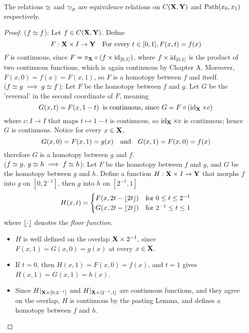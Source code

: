 \documentclass[../main-manifolds.tex]{subfiles}
\begin{document}
\begin{wts}\label{munkres:lemma-51.1}
    The relations $\simeq$ and $\simeq_p$ are equivalence relations on $C({\mathbf{X}},{\mathbf{Y}})$ and $\Path[x_0,x_1]$ respectively.
\end{wts}
\begin{proof}
    ($f\simeq f$): Let $f\in C({\mathbf{X}}, {\mathbf{Y}})$. Define 
    \[
        F:{\mathbf{X}}\times I\to {\mathbf{Y}}\quad \text{For every } t\in [0,1], F(x,t)=f(x)
    \]
    $F$ is continuous, since $F = \pi_{{\mathbf{X}}}\circ (f\times \operatorname{id}_{[0,1]})$, where $f\times \operatorname{id}_{[0,1]}$ is the product of two continuous functions, which is again continuous by Chapter A. Moreover, $F(x,0)=f(x)=F(x,1)$, so $F$ is a homotopy between $f$ and itself.\\

    ($f\simeq g\implies g\simeq f$): Let $F$ be the homotopy between $f$ and $g$. Let $G$ be the 'reversal' in the second coordinate of $F$, meaning
    \[
        G(x,t)= F(x,1-t)\:\text{ is continuous, since } G = F\circ (\operatorname{id}_{{\mathbf{X}}}\times c)
    \]
    where $c:I\to I$ that maps $t\mapsto 1-t$ is continuous, so $\operatorname{id}_{{\mathbf{X}}}\times c$ is continuous; hence $G$ is continuous. Notice for every $x\in{\mathbf{X}}$,
    \[
        G(x,0)=F(x,1)=g(x)\qqtext{and}G(x,1)=F(x,0)=f(x)
    \]
    therefore $G$ is a homotopy between $g$ and $f$. \\

    ($f\simeq g,\: g\simeq h\implies f\simeq h$): Let $F$ be the homotopy between $f$ and $g$, and $G$ be the homotopy between $g$ and $h$. Define a function $H: {\mathbf{X}}\times I\to {\mathbf{Y}}$ that morphs $f$ into $g$ on $[0,2^{-1}]$, then $g$ into $h$ on $[2^{-1},1]$
    \begin{equation}\label{munkres:lemma-51.1-product}
        H(x,t) = \begin{cases}
            F(x,2t-\lfloor2t\rfloor) & \text{for } 0\leq t\leq 2^{-1}\\
            G(x,2t-\lfloor2t\rfloor) & \text{for } 2^{-1}\leq t\leq 1\\
        \end{cases}
    \end{equation}
    where $\lfloor\cdot\rfloor$ denotes the \emph{floor function}. 
    \begin{itemize}
        \item $H$ is well defined on the overlap ${\mathbf{X}}\times 2^{-1}$, since $F(x,1)=G(x,0)=g(x)$ at every $x\in{\mathbf{X}}$. 
        \item If $t=0$, then $H(x,1)=F(x,0)=f(x)$, and $t=1$ gives $H(x,1)=G(x,1)=h(x)$.
        \item Since $H|_{{\mathbf{X}}\times [0,2^{-1}]}$ and $H|_{{\mathbf{X}}\times[2^{-1},1]}$ are continuous functions, and they agree on the overlap, $H$ is continuous by the pasting Lemma, and defines a homotopy between $f$ and $h$.
    \end{itemize}



\end{proof}
\end{document}
